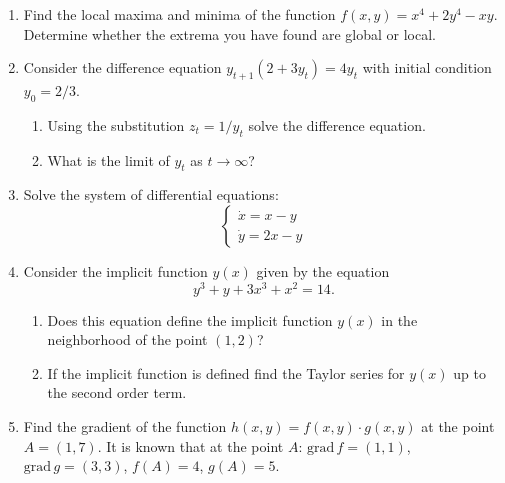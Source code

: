 \documentclass[12pt,a4paper]{article}
\providecommand{\grad}{\mathrm{grad}\,}
\begin{document}
\begin{enumerate}

\item Find the local maxima and minima of the function $f(x,y)=x^4+2y^4-xy$. Determine whether the extrema you have found are global or local.

\item Consider the difference equation $y_{t+1}(2+3y_t)=4y_t$ with initial condition $y_0=2/3$.
\begin{enumerate}
\item Using the substitution $z_t=1/y_t$ solve the difference equation.
\item What is the limit of $y_t$ as $t\to\infty$?
\end{enumerate}  

\item Solve the system of differential equations:
\[
\begin{cases}
\dot{x}=x-y \\
\dot{y}=2x-y
\end{cases}
\]


\item Consider the implicit function $y(x)$ given by the equation 
\[
y^3+y+3x^3+x^2=14.
\]
\begin{enumerate}
\item Does this equation define the implicit function $y(x)$ in the neighborhood of the point $(1,2)$? 
\item If the implicit function is defined find the Taylor series for $y(x)$ up to the second order term.
\end{enumerate}

\item Find the gradient of the function $h(x,y)=f(x,y)\cdot g(x,y)$ at the point $A=(1,7)$. It is known that at the point $A$: $\grad f=(1,1)$, $\grad g=(3,3)$, $f(A)=4$, $g(A)=5$.


\end{enumerate}
\end{document}
